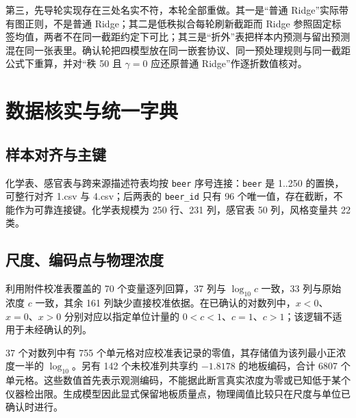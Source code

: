 \documentclass[11pt,a4paper]{article}
\begin{document}
第三，先导轮实现存在三处名实不符，本轮全部重做。其一是``普通
Ridge''实际带有图正则，不是普通 Ridge；其二是低秩拟合每轮刷新截距而
Ridge
参照固定标签均值，两者不在同一截距约定下可比；其三是``折外''表把样本内预测与留出预测混在同一张表里。确认轮把四模型放在同一嵌套协议、同一预处理规则与同一截距公式下重算，并对``秩
50 且 \(\gamma=0\) 应还原普通 Ridge''作逐折数值核对。

\section{数据核实与统一字典}\label{ux6570ux636eux6838ux5b9eux4e0eux7edfux4e00ux5b57ux5178}

\subsection{样本对齐与主键}\label{ux6837ux672cux5bf9ux9f50ux4e0eux4e3bux952e}

化学表、感官表与跨来源描述符表均按 \texttt{beer} 序号连接：\texttt{beer}
是 1..250 的置换，可整行对齐 1.csv 与 4.csv；后两表的 \texttt{beer\_id}
只有 96 个唯一值，存在截断，不能作为可靠连接键。化学表规模为 250 行、231
列，感官表 50 列，风格变量共 22 类。

\subsection{尺度、编码点与物理浓度}\label{ux5c3aux5ea6ux7f16ux7801ux70b9ux4e0eux7269ux7406ux6d53ux5ea6}

利用附件校准表覆盖的 70 个变量逐列回算，37 列与 \(\log_{10}c\) 一致，33
列与原始浓度 \(c\) 一致，其余 161
列缺少直接校准依据。在已确认的对数列中，\(x<0\)、\(x=0\)、\(x>0\)
分别对应以指定单位计量的
\(0<c<1\)、\(c=1\)、\(c>1\)；该逻辑不适用于未经确认的列。

37 个对数列中有 755
个单元格对应校准表记录的零值，其存储值为该列最小正浓度一半的
\(\log_{10}\)。另有 142 个未校准列共享约 \(-1.8178\) 的地板编码，合计
6807
个单元格。这些数值首先表示观测编码，不能据此断言真实浓度为零或已知低于某个仪器检出限。生成模型因此显式保留地板质量点，物理阈值比较只在尺度与单位已确认时进行。
\end{document}
